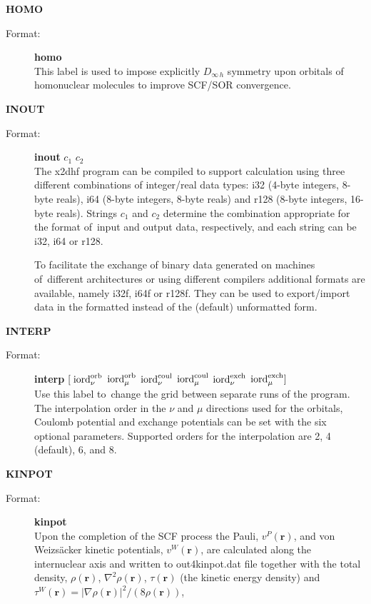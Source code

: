 \documentclass[10pt,a4paper]{article}
\newcommand{\fb}[1]{\textbf{#1}}
\begin{document}
\begin{description}
\item \textbf{HOMO}
\begin{description}
\item[Format:] \textbf{homo}  \\
This label is used to impose explicitly $D_{\infty\,h}$ symmetry upon orbitals
of homonuclear molecules to improve SCF/SOR convergence.
\end{description}
\item \textbf{INOUT}
\begin{description}
\item[Format:] \textbf{inout} $c_1$ $c_2$\\ The x2dhf program can be
  compiled to support calculation using three different combinations of
  integer/real data types: i32 (4-byte integers, 8-byte reals), i64 (8-byte
  integers, 8-byte reals) and r128 (8-byte integers, 16-byte reals).
  Strings $c_1$ and $c_2$ determine the combination appropriate for the
  format of~input and output data, respectively, and each string can be
  i32, i64 or r128.

  To facilitate the exchange of binary data generated on machines
  of~different architectures or using different compilers additional
  formats are available, namely i32f, i64f or r128f. They can be used to
  export/import data in the formatted instead of the (default) unformatted form.
\end{description}


\item \textbf{INTERP}
\begin{description}
\item[Format:] \textbf{interp} $[\; {\rm iord}_\nu^{\rm orb}$ ${\rm
    iord}_\mu^{\rm orb}$ ${\rm iord}_\nu^{\rm coul}$ ${\rm
    iord}_\mu^{\rm coul}$ ${\rm iord}_\nu^{\rm exch}$ ${\rm
    iord}_\mu^{\rm exch} ]$\\ Use this label to~change the grid
  between separate runs of the program. The interpolation order in the
  $\nu$ and $\mu$ directions used for the orbitals, Coulomb potential
  and exchange potentials can be set with the six optional
  parameters. Supported orders for the interpolation are 2, 4
  (default), 6, and 8.
\end{description}

\item \textbf{KINPOT}
\begin{description}
\item[Format:] \textbf{kinpot}  \\
  Upon the completion of the SCF process the Pauli, $v^P(\fb{r})$, and
  von Weizs\"acker kinetic potentials, $v^W(\fb{r})$, are calculated
  along the internuclear axis and written to out4kinpot.dat file together
  with the total density, $\rho(\fb{r})$, $\nabla^2 \rho(\fb{r})$,
  $\tau(\fb{r})$ (the kinetic energy density) and 
  $\tau^W(\fb{r})=|\nabla \rho(\fb{r})|^2/(8\rho(\fb{r}))$,
\end{description}


\end{description}
\end{document}
